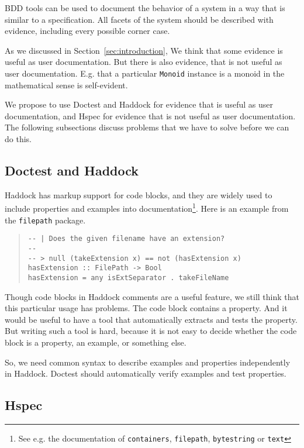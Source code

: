 \documentclass[preprint]{sigplanconf}
\begin{document}
BDD tools can be used to document the behavior of a system in a way that
is similar to a specification.  All facets of the system should be
described with evidence, including every possible corner case.

As we discussed in Section~\ref{sec:introduction},
We think that some evidence is useful as user documentation.
But there is also evidence, that is not
useful as user documentation.  E.g. that a particular \texttt{Monoid}
instance is a monoid in the mathematical sense is self-evident.

We propose to use Doctest and Haddock for evidence that is useful as
user documentation, and Hspec for evidence that is not useful as user
documentation.  The following subsections discuss problems that we
have to solve before we can do this.

\subsection{Doctest and Haddock}
\label{sec:doctest-haddock}

Haddock has markup support for code blocks, and they are widely used
to include properties and examples into documentation\footnote{
See e.g. the documentation of
{\tt containers},
{\tt filepath},
{\tt bytestring} or
{\tt text}}.
Here is an example from the {\tt filepath} package.

\begin{quote}
\small
\begin{verbatim}
-- | Does the given filename have an extension?
--
-- > null (takeExtension x) == not (hasExtension x)
hasExtension :: FilePath -> Bool
hasExtension = any isExtSeparator . takeFileName
\end{verbatim}
\end{quote}

\noindent Though code blocks in Haddock comments are a useful feature,
we still think that this particular usage has problems.  The code
block contains a property.  And it would be useful to have a tool that
automatically extracts and tests the property.
But writing such a tool is hard, because it is not easy to decide
whether the code block is a property, an example, or something else.

So, we need common syntax to describe examples and properties
independently in Haddock. Doctest should automatically verify
examples and test properties.

\subsection{Hspec}
\end{document}
